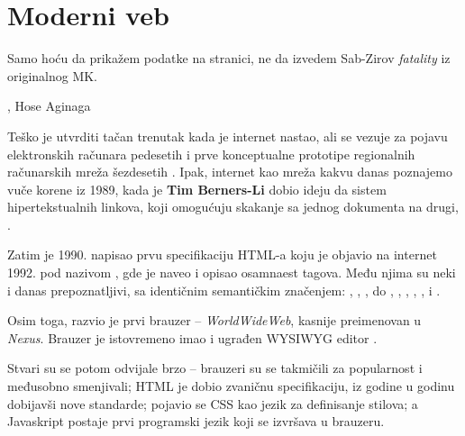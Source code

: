 \chapter{Moderni veb}

\epigraph{
  Samo hoću da prikažem podatke na stranici, ne da izvedem Sab-Zirov \textsl{fatality} iz originalnog MK.
}{, Hose Aginaga \cite{hose:how-js-feels-2016}}

Teško je utvrditi tačan trenutak kada je internet nastao, ali se vezuje za pojavu elektronskih računara pedesetih i prve konceptualne prototipe regionalnih računarskih mreža šezdesetih \cite{history:internet}.
Ipak, internet kao mreža kakvu danas poznajemo vuče korene iz 1989, kada je \textbf{Tim Berners-Li} dobio ideju da sistem hipertekstualnih linkova, koji omogućuju skakanje sa jednog dokumenta na drugi,  \cite{lee:answers-for-young-people}.

Zatim je 1990. napisao prvu specifikaciju HTML-a koju je objavio na internet 1992. pod nazivom , gde je naveo i opisao osamnaest tagova. Među njima su neki i danas prepoznatljivi, sa identičnim semantičkim značenjem: , , ,  do , , , , ,  i  \cite{lee:html-tags}.

Osim toga, razvio je prvi brauzer -- \textit{WorldWideWeb}, kasnije preimenovan u \textit{Nexus}.
Brauzer je istovremeno imao i ugrađen WYSIWYG editor \cite{lee:www-browser}.

Stvari su se potom odvijale brzo -- brauzeri su se takmičili za popularnost i međusobno smenjivali; HTML je dobio zvaničnu specifikaciju, iz godine u godinu dobijavši nove standarde; pojavio se CSS kao jezik za definisanje stilova; a Javaskript postaje prvi programski jezik koji se izvršava u brauzeru.










